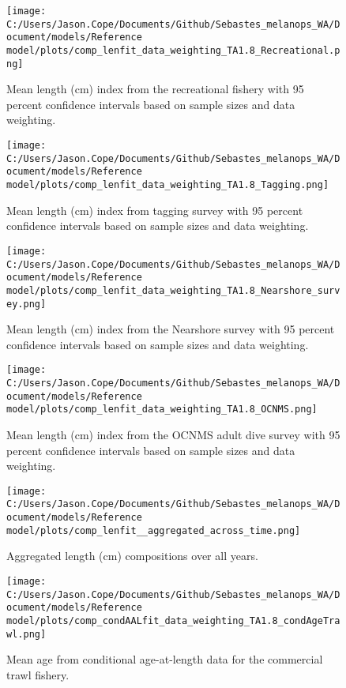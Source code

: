 \documentclass[11pt,
  english,
  letterpaper,
]{article}
\begin{document}
\begin{figure}
\centering
\texttt{[image: C:/Users/Jason.Cope/Documents/Github/Sebastes\_melanops\_WA/Document/models/Reference model/plots/comp\_lenfit\_data\_weighting\_TA1.8\_Recreational.png]}
\caption{Mean length (cm) index from the recreational fishery with 95 percent confidence intervals based on sample sizes and data weighting.\label{fig:rec-mean-len-fit}}
\end{figure}

\begin{figure}
\centering
\texttt{[image: C:/Users/Jason.Cope/Documents/Github/Sebastes\_melanops\_WA/Document/models/Reference model/plots/comp\_lenfit\_data\_weighting\_TA1.8\_Tagging.png]}
\caption{Mean length (cm) index from tagging survey with 95 percent confidence intervals based on sample sizes and data weighting.\label{fig:tag-mean-len-fit}}
\end{figure}

\begin{figure}
\centering
\texttt{[image: C:/Users/Jason.Cope/Documents/Github/Sebastes\_melanops\_WA/Document/models/Reference model/plots/comp\_lenfit\_data\_weighting\_TA1.8\_Nearshore\_survey.png]}
\caption{Mean length (cm) index from the Nearshore survey with 95 percent confidence intervals based on sample sizes and data weighting.\label{fig:nearshore-mean-len-fit}}
\end{figure}

\begin{figure}
\centering
\texttt{[image: C:/Users/Jason.Cope/Documents/Github/Sebastes\_melanops\_WA/Document/models/Reference model/plots/comp\_lenfit\_data\_weighting\_TA1.8\_OCNMS.png]}
\caption{Mean length (cm) index from the OCNMS adult dive survey with 95 percent confidence intervals based on sample sizes and data weighting.\label{fig:ocnms-mean-len-fit}}
\end{figure}

\begin{figure}
\centering
\texttt{[image: C:/Users/Jason.Cope/Documents/Github/Sebastes\_melanops\_WA/Document/models/Reference model/plots/comp\_lenfit\_\_aggregated\_across\_time.png]}
\caption{Aggregated length (cm) compositions over all years.\label{fig:agg-len-fit}}
\end{figure}

\begin{figure}
\centering
\texttt{[image: C:/Users/Jason.Cope/Documents/Github/Sebastes\_melanops\_WA/Document/models/Reference model/plots/comp\_condAALfit\_data\_weighting\_TA1.8\_condAgeTrawl.png]}
\caption{Mean age from conditional age-at-length data for the commercial trawl fishery.\label{fig:trawl-mean-caal}}
\end{figure}
\end{document}
